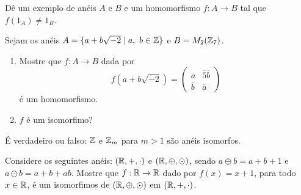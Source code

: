 \documentclass[12pt]{exam}
\begin{document}
\vspace{.3cm}

\questao{} D{\^e} um exemplo de an{\'e}is $A$ e $B$ e um homomorfismo $f : A \to B$ tal que $f(1_A) \ne 1_B$.

\vspace{.3cm}

\questao{} Sejam os an{\'e}is $A = \{ a + b\sqrt{-2} \mid a,\ b \in \mathbb{Z}\}$ e $B = M_2(\mathbb{Z}_7)$.
\begin{enumerate}[label=({\alph*})]
\item Mostre que $f : A \to B$ dada por
\[
f(a + b\sqrt{-2}) =
\begin{pmatrix}
\overline{a} & \overline{5}\overline{b}\\
\overline{b} & \overline{a}
\end{pmatrix}
\]
{\'e} um homomorfismo.
\item $f$ {\'e} um isomorfimo?
\end{enumerate}

\vspace{.3cm}

\questao{} {\'E} verdadeiro ou falso: $\mathbb{Z}$ e $\mathbb{Z}_{m}$ para $m > 1$ s{\~a}o an{\'e}is
isomorfos.

\vspace{.3cm}

\questao{} Considere os seguintes an{\'e}is: $(\mathbb{R}, +, \cdot)$ e $(\mathbb{R}, \oplus, \odot)$, sendo $a \oplus b = a + b + 1$ e $a \odot b = a + b + ab$. Mostre que $f : \mathbb{R} \to \mathbb{R}$ dado por $f(x) = x + 1$, para todo $x \in \mathbb{R}$, {\'e} um isomorfimos de $(\mathbb{R}, \oplus, \odot)$ em $(\mathbb{R}, +, \cdot)$.
\end{document}
